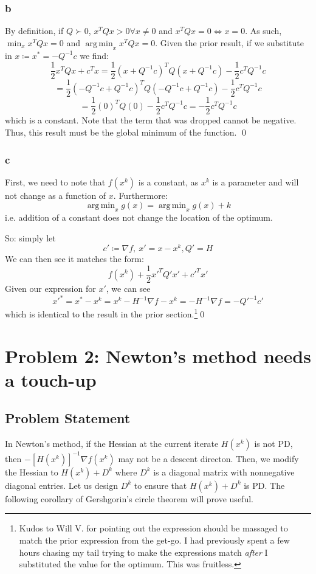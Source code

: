 \documentclass[11pt]{report}
\theoremstyle{definition}
\DeclareMathOperator*{\argmin}{arg\,min}
\begin{document}
\subsubsection*{b}
By definition, if $Q\succ0$, $x^TQx>0\forall x\neq 0$ and $x^TQx=0\iff x=0$.
As such, $\min_x x^TQx = 0$ and $\argmin_x x^TQx = 0$.
Given the prior result, if we substitute in $x\coloneqq x^*=-Q^{-1}c$ we find:
\[
	\frac{1}{2}x^TQx+c^Tx
	= \frac{1}{2}(x+Q^{-1}c)^TQ(x+Q^{-1}c)-\frac{1}{2}c^TQ^{-1}c
\]
\[
	= \frac{1}{2}(-Q^{-1}c+Q^{-1}c)^TQ(-Q^{-1}c+Q^{-1}c)-\frac{1}{2}c^TQ^{-1}c
\]
\[
	= \frac{1}{2}(0)^TQ(0)-\frac{1}{2}c^TQ^{-1}c
	= -\frac{1}{2}c^TQ^{-1}c
\]
which is a constant. Note that the term that was dropped cannot be negative. Thus, this
result must be the global minimum of the function.
\qed
\subsubsection*{c}
First, we need to note that $f(x^k)$ is a constant, as $x^k$ is a parameter
and will not change as a function of $x$. Furthermore:
\[\argmin_{x} g(x) = \argmin_x g(x) + k\]
i.e. addition of a constant does not change the location of the optimum.

So: simply let
\[ c'\coloneqq \nabla f,\ x' = x-x^k, Q' = H \]
We can then see it matches the form:
\[f(x^k) + \frac{1}{2}x'^TQ'x'+c'^Tx'\]
Given our expression for $x'$, we can see
\[
	x'^* = x^*-x^k = x^k-H^{-1}\nabla f - x^k
	= -H^{-1}\nabla f
	= -Q'^{-1}c'
\]
which is identical to the result in the prior section.\footnote{
	Kudos to Will V. for pointing out the expression should be massaged to match the
	prior expression from the get-go. I had previously spent a few hours chasing my
	tail trying to make the expressions match \textit{after} I substituted the value
	for the optimum. This was fruitless.
}\qed



\newpage
\section*{Problem 2: Newton's method needs a touch-up}
\subsection*{Problem Statement}
In Newton's method, if the Hessian at the current iterate $H(x^k)$ is not PD,
then $-[H(x^k)]^{-1}\nabla f(x^k)$ may not be a descent directon. Then, we modify the Hessian to
$H(x^k)+D^k$ where $D^k$ is a diagonal matrix with nonnegative diagonal entries. Let us design
$D^k$ to ensure that $H(x^k)+D^k$ is PD. The following corollary of Gershgorin's circle theorem
will prove useful.
\end{document}
